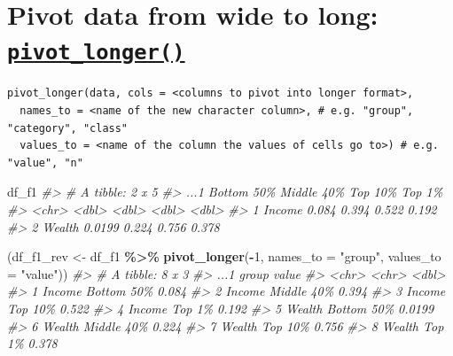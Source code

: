 \documentclass[
  xelatex, ja=standard]{bxjsbook}
\newenvironment{Shaded}{\begin{snugshade}}{\end{snugshade}}
\newcommand{\AttributeTok}[1]{\textcolor[rgb]{0.13,0.29,0.53}{#1}}
\newcommand{\CommentTok}[1]{\textcolor[rgb]{0.56,0.35,0.01}{\textit{#1}}}
\newcommand{\DecValTok}[1]{\textcolor[rgb]{0.00,0.00,0.81}{#1}}
\newcommand{\FunctionTok}[1]{\textcolor[rgb]{0.13,0.29,0.53}{\textbf{#1}}}
\newcommand{\NormalTok}[1]{#1}
\newcommand{\OtherTok}[1]{\textcolor[rgb]{0.56,0.35,0.01}{#1}}
\newcommand{\SpecialCharTok}[1]{\textcolor[rgb]{0.81,0.36,0.00}{\textbf{#1}}}
\newcommand{\StringTok}[1]{\textcolor[rgb]{0.31,0.60,0.02}{#1}}
\theoremstyle{definition}
\theoremstyle{definition}
\theoremstyle{definition}
\theoremstyle{definition}
\theoremstyle{remark}
\begin{document}
\hypertarget{pivot-data-from-wide-to-long-pivot_longer}{%
\section{\texorpdfstring{Pivot data from wide to long: \href{https://tidyr.tidyverse.org/reference/pivot_longer.html}{\texttt{pivot\_longer()}}}{Pivot data from wide to long: pivot\_longer()}}\label{pivot-data-from-wide-to-long-pivot_longer}}

\begin{verbatim}
pivot_longer(data, cols = <columns to pivot into longer format>,
  names_to = <name of the new character column>, # e.g. "group", "category", "class"
  values_to = <name of the column the values of cells go to>) # e.g. "value", "n"
\end{verbatim}

\begin{Shaded}
\begin{Highlighting}[]
\NormalTok{df\_f1}
\CommentTok{\#\textgreater{} \# A tibble: 2 x 5}
\CommentTok{\#\textgreater{}   ...1   \textasciigrave{}Bottom 50\%\textasciigrave{} \textasciigrave{}Middle 40\%\textasciigrave{} \textasciigrave{}Top 10\%\textasciigrave{} \textasciigrave{}Top 1\%\textasciigrave{}}
\CommentTok{\#\textgreater{}   \textless{}chr\textgreater{}         \textless{}dbl\textgreater{}        \textless{}dbl\textgreater{}     \textless{}dbl\textgreater{}    \textless{}dbl\textgreater{}}
\CommentTok{\#\textgreater{} 1 Income       0.084         0.394     0.522    0.192}
\CommentTok{\#\textgreater{} 2 Wealth       0.0199        0.224     0.756    0.378}
\end{Highlighting}
\end{Shaded}

\begin{Shaded}
\begin{Highlighting}[]
\NormalTok{(df\_f1\_rev }\OtherTok{\textless{}{-}}\NormalTok{ df\_f1 }\SpecialCharTok{\%\textgreater{}\%} \FunctionTok{pivot\_longer}\NormalTok{(}\SpecialCharTok{{-}}\DecValTok{1}\NormalTok{, }\AttributeTok{names\_to =} \StringTok{"group"}\NormalTok{, }\AttributeTok{values\_to =} \StringTok{"value"}\NormalTok{))}
\CommentTok{\#\textgreater{} \# A tibble: 8 x 3}
\CommentTok{\#\textgreater{}   ...1   group       value}
\CommentTok{\#\textgreater{}   \textless{}chr\textgreater{}  \textless{}chr\textgreater{}       \textless{}dbl\textgreater{}}
\CommentTok{\#\textgreater{} 1 Income Bottom 50\% 0.084 }
\CommentTok{\#\textgreater{} 2 Income Middle 40\% 0.394 }
\CommentTok{\#\textgreater{} 3 Income Top 10\%    0.522 }
\CommentTok{\#\textgreater{} 4 Income Top 1\%     0.192 }
\CommentTok{\#\textgreater{} 5 Wealth Bottom 50\% 0.0199}
\CommentTok{\#\textgreater{} 6 Wealth Middle 40\% 0.224 }
\CommentTok{\#\textgreater{} 7 Wealth Top 10\%    0.756 }
\CommentTok{\#\textgreater{} 8 Wealth Top 1\%     0.378}
\end{Highlighting}
\end{Shaded}
\end{document}
